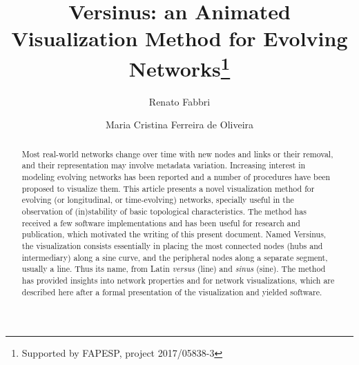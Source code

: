 \documentclass[runningheads]{llncs}
\begin{document}
%
\title{Versinus: an Animated Visualization Method for Evolving Networks\thanks{Supported by FAPESP, project 2017/05838-3}}
%
%
\author{Renato Fabbri \and
Maria Cristina Ferreira de Oliveira}
%
%
%
\maketitle              %
%
\begin{abstract}
Most real-world networks change over time with new nodes and links or their removal, and their representation may involve metadata variation.
Increasing interest in modeling evolving networks has been reported and
a number of procedures have been proposed to visualize them.
  This article presents a novel visualization method for evolving (or longitudinal, or time-evolving) networks,
  specially useful in the observation of (in)stability of basic topological characteristics.
  The method has received a few software implementations and has been useful for research and publication, which motivated the writing of this present document.
  Named Versinus, the visualization consists essentially in placing the most connected nodes (hubs and intermediary) along a sine curve, and the peripheral nodes along a separate segment, usually a line.
  Thus its name, from  Latin \emph{versus} (line) and \emph{sinus} (sine).
  The method has provided insights into network properties and for network visualizations, which are described here after a formal presentation of the visualization and yielded software.


\end{abstract}
%
%
%
\end{document}
